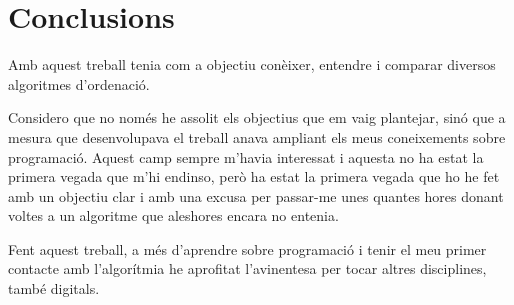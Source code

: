 \chapter{Conclusions}
Amb aquest treball tenia com a objectiu conèixer, entendre i comparar diversos algoritmes d'ordenació.

Considero que no només he assolit els objectius que em vaig plantejar, sinó que a mesura que desenvolupava el treball anava ampliant els meus coneixements sobre programació. Aquest camp sempre m'havia interessat i aquesta no ha estat la primera vegada que m'hi endinso, però ha estat la primera vegada que ho he fet amb un objectiu clar i amb una excusa per passar-me unes quantes hores donant voltes a un algoritme que aleshores encara no entenia.

Fent aquest treball, a més d'aprendre sobre programació i tenir el meu primer contacte amb l'algorítmia he aprofitat l'avinentesa per tocar altres disciplines, també digitals.